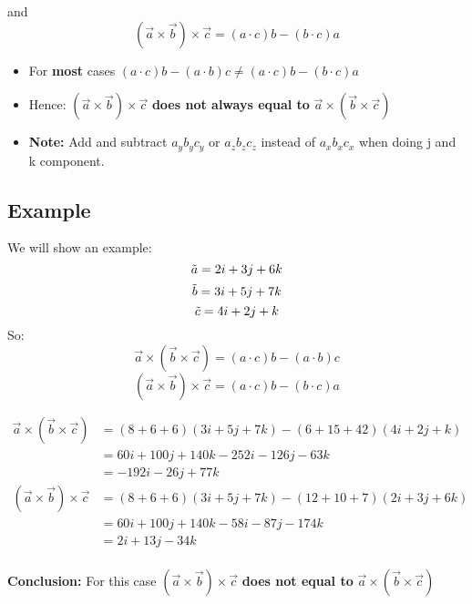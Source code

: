 \documentclass[10pt]{article}
\begin{document}
and
\begin{displaymath}
  \left( \vec{a} \times \vec{b} \right) \times \vec {c} =(a \cdot c)b-(b \cdot c)a
\end{displaymath}
\begin{itemize}
\item For \textbf{most} cases $(a \cdot c)b-(a \cdot b)c \neq (a \cdot c)b-(b \cdot c)a$ 
\item Hence: $\left( \vec{a} \times \vec{b} \right) \times \vec {c}$ \textbf{does not always equal to} $\vec{a} \times \left( \vec{b}  \times \vec {c} \right)$
\item \textbf{Note:} Add and subtract $a_yb_yc_y$ or $a_zb_zc_z$ instead of $a_xb_xc_x$ when doing j and k component.
\end{itemize}
\pagebreak
\subsection{Example}
We will show an example:
\begin{equation}
\tilde{a}=2i+3j+6k \\
\end{equation}
\begin{equation}
\tilde{b}=3i+5j+7k \\
\end{equation}
\begin{equation}
\tilde{c}=4i+2j+k \\
\end{equation}
So:
\begin{displaymath}
  \vec{a} \times \left( \vec{b}  \times \vec {c} \right)  =(a \cdot c)b-(a \cdot b)c
\end{displaymath}
\begin{displaymath}
  \left( \vec{a} \times \vec{b} \right) \times \vec {c} =(a \cdot c)b-(b \cdot c)a
\end{displaymath}

\begin{align*}
  \vec{a} \times \left( \vec{b}  \times \vec {c} \right)  &=(8+6+6)(3i+5j+7k)-(6+15+42)(4i+2j+k) \\
&= 60i+100j+140k-252i-126j-63k \\
&=-192i-26j+77k \\
 \left( \vec{a} \times \vec{b} \right) \times \vec {c} &= (8+6+6)(3i+5j+7k)-(12+10+7)(2i+3j+6k)\\
&= 60i+100j+140k-58i-87j-174k \\
&=2i+13j-34k
\end{align*} \\
\textbf{Conclusion:} For this case $\left( \vec{a} \times \vec{b} \right) \times \vec {c}$ \textbf{does not equal to} $\vec{a} \times \left( \vec{b}  \times \vec {c} \right)$
\pagebreak
\end{document}
